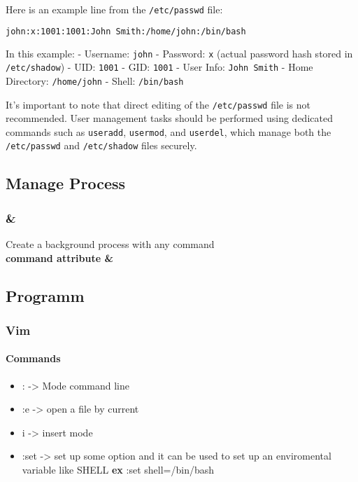 \documentclass{article}
\begin{document}
                        Here is an example line from the \texttt{/etc/passwd} file:
                        \begin{lstlisting}[language=sh]
                        john:x:1001:1001:John Smith:/home/john:/bin/bash
                        \end{lstlisting}
                        In this example:
                        - Username: \texttt{john}
                        - Password: \texttt{x} (actual password hash stored in \texttt{/etc/shadow})
                        - UID: \texttt{1001}
                        - GID: \texttt{1001}
                        - User Info: \texttt{John Smith}
                        - Home Directory: \texttt{/home/john}
                        - Shell: \texttt{/bin/bash}

                        It's important to note that direct editing of the \texttt{/etc/passwd} file is not recommended. User management tasks should be performed using dedicated commands such as \texttt{useradd}, \texttt{usermod}, and \texttt{userdel}, which manage both the \texttt{/etc/passwd} and \texttt{/etc/shadow} files securely.

    \subsection{Manage Process}
                    \subsubsection{\&}
                        Create a background process with any command\\
                        \textbf{command attribute \& }
                \subsection{Programm}
                        \subsubsection{Vim}
                            \paragraph{Commands}
                                \begin{itemize}
                                    \item : -> Mode command line
                                    \item :e -> open a file by current
                                    \item i -> insert mode 
                                    \item :set -> set up some option and it can be used to set up an enviromental variable like SHELL \textbf{ex} :set shell=/bin/bash
                                \end{itemize}
\end{document}
